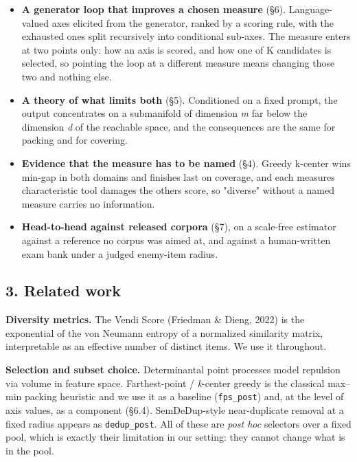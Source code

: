 \documentclass[
  10pt,
]{article}
\providecommand{\tightlist}{%
  \setlength{\itemsep}{0pt}\setlength{\parskip}{0pt}}
\theoremstyle{plain}
\theoremstyle{definition}
\providecommand{\tightlist}{\setlength{\itemsep}{0pt}\setlength{\parskip}{0pt}}
\begin{document}
\begin{itemize}
\tightlist
\item
  \textbf{A generator loop that improves a chosen measure} (§6).
  Language-valued axes elicited from the generator, ranked by a scoring
  rule, with the exhausted ones split recursively into conditional
  sub-axes. The measure enters at two points only: how an axis is
  scored, and how one of K candidates is selected, so pointing the loop
  at a different measure means changing those two and nothing else.
\item
  \textbf{A theory of what limits both} (§5). Conditioned on a fixed
  prompt, the output concentrates on a submanifold of dimension \emph{m}
  far below the dimension \emph{d} of the reachable space, and the
  consequences are the same for packing and for covering.
\item
  \textbf{Evidence that the measure has to be named} (§4). Greedy
  k-center wins min-gap in both domains and finishes last on coverage,
  and each measure\textquotesingle s characteristic tool damages the
  other\textquotesingle s score, so "diverse" without a named measure
  carries no information.
\item
  \textbf{Head-to-head against released corpora} (§7), on a scale-free
  estimator against a reference no corpus was aimed at, and against a
  human-written exam bank under a judged enemy-item radius.
\end{itemize}

\subsection{3. Related work}\label{3-related-work}

\textbf{Diversity metrics.} The Vendi Score (Friedman \& Dieng, 2022) is
the exponential of the von Neumann entropy of a normalized similarity
matrix, interpretable as an effective number of distinct items. We use
it throughout.

\textbf{Selection and subset choice.} Determinantal point processes
model repulsion via volume in feature space. Farthest-point /
\emph{k}-center greedy is the classical max--min packing heuristic and
we use it as a baseline (\texttt{fps\_post}) and, at the level of axis
values, as a component (§6.4). SemDeDup-style near-duplicate removal at
a fixed radius appears as \texttt{dedup\_post}. All of these are
\emph{post hoc} selectors over a fixed pool, which is exactly their
limitation in our setting: they cannot change what is in the pool.
\end{document}
